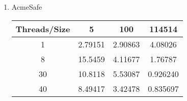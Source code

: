 \documentclass[letterpaper,twocolumn,10pt]{article}
\begin{document}
\begin{enumerate}
\begin{enumerate}
    \item 
    AcmeSafe 
    \begin{center}
      \begin{tabular}{|c|c|c|c|}
      \hline
        Threads/Size & 5 & 100 & 114514 \\
      \hline 1 & 2.79151 & 2.90863 & 4.08026 \\
      \hline 8 & 15.5459 & 4.11677 & 1.76787 \\
      \hline 30 & 10.8118 & 5.53087 & 0.926240 \\
      \hline 40 & 8.49417 & 3.42478 & 0.835697 \\
      \hline
      \end{tabular}
    \end{center}
  \end{enumerate}


\end{enumerate}
\end{document}

